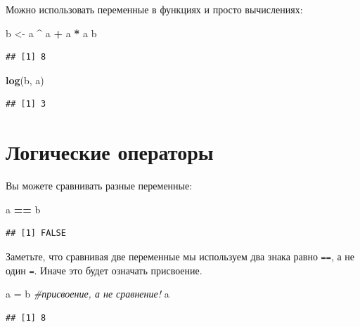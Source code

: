 \documentclass[
]{book}
\newenvironment{Shaded}{\begin{snugshade}}{\end{snugshade}}
\newcommand{\CommentTok}[1]{\textcolor[rgb]{0.56,0.35,0.01}{\textit{#1}}}
\newcommand{\KeywordTok}[1]{\textcolor[rgb]{0.13,0.29,0.53}{\textbf{#1}}}
\newcommand{\NormalTok}[1]{#1}
\newcommand{\OperatorTok}[1]{\textcolor[rgb]{0.81,0.36,0.00}{\textbf{#1}}}
\newcommand{\StringTok}[1]{\textcolor[rgb]{0.31,0.60,0.02}{#1}}
\begin{document}
Можно использовать переменные в функциях и просто вычислениях:

\begin{Shaded}
\begin{Highlighting}[]
\NormalTok{b <-}\StringTok{ }\NormalTok{a }\OperatorTok{^}\StringTok{ }\NormalTok{a }\OperatorTok{+}\StringTok{ }\NormalTok{a }\OperatorTok{*}\StringTok{ }\NormalTok{a}
\NormalTok{b}
\end{Highlighting}
\end{Shaded}

\begin{verbatim}
## [1] 8
\end{verbatim}

\begin{Shaded}
\begin{Highlighting}[]
\KeywordTok{log}\NormalTok{(b, a)}
\end{Highlighting}
\end{Shaded}

\begin{verbatim}
## [1] 3
\end{verbatim}

\hypertarget{logic}{%
\section{Логические операторы}\label{logic}}

Вы можете сравнивать разные переменные:

\begin{Shaded}
\begin{Highlighting}[]
\NormalTok{a }\OperatorTok{==}\StringTok{ }\NormalTok{b}
\end{Highlighting}
\end{Shaded}

\begin{verbatim}
## [1] FALSE
\end{verbatim}

Заметьте, что сравнивая две переменные мы используем два знака равно \texttt{==}, а не один \texttt{=}. Иначе это будет означать присвоение.

\begin{Shaded}
\begin{Highlighting}[]
\NormalTok{a =}\StringTok{ }\NormalTok{b }\CommentTok{#присвоение, а не сравнение!}
\NormalTok{a}
\end{Highlighting}
\end{Shaded}

\begin{verbatim}
## [1] 8
\end{verbatim}
\end{document}
